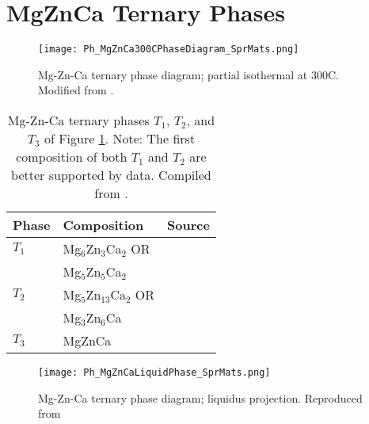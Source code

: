 \documentclass[a4paper,12pt,oneside]{report}%
\begin{document}
\clearpage
\newpage

\section{MgZnCa Ternary Phases} \label{sec:TernaryPhases}

\begin{figure}[htb]
	\centering
	\texttt{[image: Ph\_MgZnCa300CPhaseDiagram\_SprMats.png]}
	\caption[Mg-Zn-Ca ternary phase diagram; partial isothermal at 300\degree C.]{Mg-Zn-Ca ternary phase diagram; partial isothermal at 300\degree C. Modified from \cite{Melnik1978}.}
	\label{fig:MgZnCa300PhaseD}
\end{figure}

\begin{table}[H]
	\centering
	\begin{tabular}{ l l l }
		\toprule
		Phase & Composition & Source \\
		\midrule
		$T_{1}$ & Mg$_{6}$Zn$_{3}$Ca$_{2}$ OR & \cite{Clark1961} \\
		& Mg$_{5}$Zn$_{5}$Ca$_{2}$ & \\
		$T_{2}$	& Mg$_{5}$Zn$_{13}$Ca$_{2}$ OR & \cite{Clark1961} \\
		& Mg$_{3}$Zn$_{6}$Ca & \\
		$T_{3}$	& MgZnCa & \cite{Schulze1961} \\
		\bottomrule
	\end{tabular}
	\caption[Mg-Zn-Ca ternary phases $T_{1}$, $T_{2}$, and $T_{3}$ of Figure \ref{fig:MgZnCa300PhaseD}. Note: The first composition of both $T_{1}$ and $T_{2}$ are better supported by data.]{Mg-Zn-Ca ternary phases $T_{1}$, $T_{2}$, and $T_{3}$ of Figure \ref{fig:MgZnCa300PhaseD}. Note: The first composition of both $T_{1}$ and $T_{2}$ are better supported by data. Compiled from \cite{Clark1961, Schulze1961}.}
	\label{tab:SputterParameters}
\end{table}

\begin{figure}[htb]
	\centering
	\texttt{[image: Ph\_MgZnCaLiquidPhase\_SprMats.png]}
	\caption[Mg-Zn-Ca ternary phase diagram; liquidus projection.]{Mg-Zn-Ca ternary phase diagram; liquidus projection. Reproduced from \cite{Paris1933}}
	\label{fig:MgZnCaLiquidPhaseD}
\end{figure}
\end{document}
